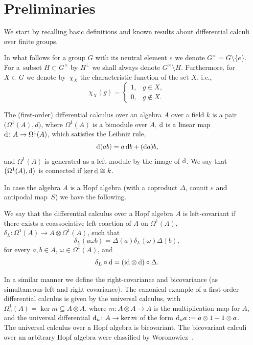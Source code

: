 \documentclass[pdftex]{sigma}
\numberwithin{equation}{section}
\begin{document}
\section{Preliminaries}

We start by recalling basic definitions and known results about differential calculi over finite groups.

In what follows for a group $G$ with its neutral element $e$ we denote
$G^\times = G \setminus \{e\}$. For a~subset $H \subset G^\times$ by $H^\perp$ we shall always
denote $G^\times \setminus H$. Furthermore, for $X \subset G$ we denote by~$\chi_X$
the characteristic function of the set $X$, i.e.,
\[
\chi_X(g)=\begin{cases}1, & g\in X, \\
0, & g\not\in X.\end{cases}
\]

\begin{Definition}The (first-order) differential calculus over an algebra $A$ over a field $k$ is a pair $\big(\Omega^1(A), d\big)$, where
$\Omega^1(A)$ is a bimodule over $A$, ${\rm d}$ is a linear map ${\rm d}\colon A\rightarrow \Omega^1(A)$, which satisfies the Leibniz rule,
\begin{equation*}
{\rm d}(ab)=a\, {\rm d}b+({\rm d}a) b,
\end{equation*}
and $\Omega^1(A)$ is generated as a left module by the image of ${\rm d}$. We say
that $\big(\Omega^1(A),{\rm d}\big)$ is connected if $\ker {\rm d} \cong k$.
\end{Definition}
In case the algebra $A$ is a Hopf algebra (with a coproduct $\Delta$, counit $\varepsilon$ and antipodal map~$S$) we have the following.
\begin{Definition}
We say that the differential calculus over a Hopf algebra $A$ is left-covariant if there exists a coassociative left coaction of
$A$ on $\Omega^1(A)$, $\delta_{L}\colon \Omega^1(A) \rightarrow A \otimes \Omega^1(A)$, such that
\begin{equation*}
\delta_{L}(a\omega b)=\Delta(a)\delta_L(\omega)\Delta(b),
\end{equation*}
for every $a,b\in A$, $\omega\in\Omega^1(A)$, and
\begin{equation*}
\delta_{L}\circ {\rm d} =(\mathrm{id}\otimes {\rm d})\circ \Delta.
\end{equation*}
\end{Definition}

In a similar manner we define the right-covariance and bicovariance (as simultaneous left and right covariance). The canonical example of a first-order differential calculus is given by the universal calculus, with $\Omega_u^1(A) = \ker m\subseteq A\otimes A$, where $m\colon A\otimes A\rightarrow A$ is the multiplication map for $A$, and the universal differential ${\rm d}_u\colon A \rightarrow \ker m$ of the form ${\rm d}_ua:=a\otimes 1 -1\otimes a$. The universal calculus over a Hopf algebra is bicovariant. The bicovariant calculi over an arbitrary Hopf algebra were classified by Woronowicz~\cite{Wo89}.
\end{document}
